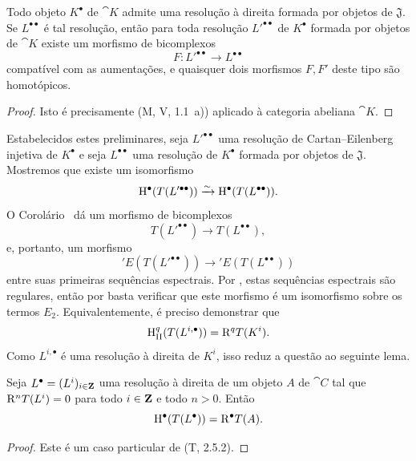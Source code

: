 \begin{corollary}[11.5.2.2]
\label{0.11.5.2.2}
Todo objeto $K^\bullet$ de $\cat{K}$ admite uma resolução à direita formada por objetos de $\mathfrak{J}$.
Se $L^{\bullet\bullet}$ é tal resolução, então para toda resolução $L'^{\bullet\bullet}$ de $K^\bullet$ formada por objetos de $\cat{K}$ existe um morfismo de bicomplexos
\[
  F:L'^{\bullet\bullet}\longrightarrow L^{\bullet\bullet}
\]
compatível com as aumentações, e quaisquer dois morfismos $F,F'$ deste tipo são homotópicos.
\end{corollary}

\begin{proof}
Isto é precisamente (M, V, 1.1~a)) aplicado à categoria abeliana $\cat{K}$.
\end{proof}

\begin{env}[11.5.2.3]
\label{0.11.5.2.3}
Estabelecidos estes preliminares, seja $L'^{\bullet\bullet}$ uma resolução de Cartan--Eilenberg injetiva de $K^\bullet$ e seja $L^{\bullet\bullet}$ uma resolução de $K^\bullet$ formada por objetos de $\mathfrak{J}$.
Mostremos que existe um isomorfismo
\[
  \mathrm{H}^\bullet(T(L'^{\bullet\bullet}))
  \xrightarrow{\sim}
  \mathrm{H}^\bullet(T(L^{\bullet\bullet})).
\]
O Corolário~ dá um morfismo de bicomplexos
\[
  T(L'^{\bullet\bullet})\longrightarrow T(L^{\bullet\bullet}),
\]
e, portanto, um morfismo
\[
  'E(T(L'^{\bullet\bullet}))\longrightarrow{}'E(T(L^{\bullet\bullet}))
\]
entre suas primeiras sequências espectrais.
Por , estas sequências espectrais são regulares, então por  basta verificar que este morfismo é um isomorfismo sobre os termos $E_2$.
Equivalentemente, é preciso demonstrar que
\[
  \mathrm{H}_\mathrm{II}^q(T(L^{i,\bullet}))=\mathrm{R}^qT(K^i).
\]
Como $L^{i,\bullet}$ é uma resolução à direita de $K^i$, isso reduz a questão ao seguinte lema.
\end{env}

\begin{lemma}[11.5.2.4]
\label{0.11.5.2.4}
Seja $L^\bullet=(L^i)_{i\in\mathbf{Z}}$ uma resolução à direita de um objeto $A$ de $\cat{C}$ tal que $\mathrm{R}^nT(L^i)=0$ para todo $i\in\mathbf{Z}$ e todo $n>0$.
Então
\[
  \mathrm{H}^\bullet(T(L^\bullet))=\mathrm{R}^\bullet T(A).
\]
\end{lemma}

\begin{proof}
Este é um caso particular de (T, 2.5.2).
\end{proof}

